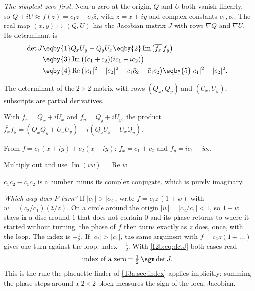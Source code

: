 \emph{The simplest zero first.} Near a zero at the origin, $Q$ and $U$ both vanish linearly, so
$Q+iU\approx f(z)=c_1z+c_2\bar z$, with $z=x+iy$ and complex constants $c_1,c_2$. The real map
$(x,y)\mapsto(Q,U)$ has the Jacobian matrix $J$ with rows $\nabla Q$ and $\nabla U$. Its determinant is
\begin{align}
  \det J
  &\eqby{1}Q_xU_y-Q_yU_x\eqby{2}\operatorname{Im}\big(\overline{f_x}\,f_y\big)\nonumber\\
  &\eqby{3}\operatorname{Im}\big((\bar c_1+\bar c_2)(ic_1-ic_2)\big)\nonumber\\
  &\eqby{4}\operatorname{Re}\big(|c_1|^2-|c_2|^2+c_1\bar c_2-\bar c_1c_2\big)
   \eqby{5}|c_1|^2-|c_2|^2 .
  \label{12b:eq:detJ}
\end{align}
\begin{explain}
  \item The determinant of the $2\times2$ matrix with rows $(Q_x,Q_y)$ and $(U_x,U_y)$; subscripts are partial
        derivatives.
  \item With $f_x=Q_x+iU_x$ and $f_y=Q_y+iU_y$, the product $\overline{f_x}f_y=(Q_xQ_y+U_xU_y)+i(Q_xU_y-U_xQ_y)$.
  \item From $f=c_1(x+iy)+c_2(x-iy)$: $f_x=c_1+c_2$ and $f_y=ic_1-ic_2$.
  \item Multiply out and use $\operatorname{Im}(iw)=\operatorname{Re}w$.
  \item $c_1\bar c_2-\bar c_1c_2$ is a number minus its complex conjugate, which is purely imaginary.
\end{explain}
\emph{Which way does $P$ turn?} If $|c_1|>|c_2|$, write $f=c_1z\,(1+w)$ with $w=(c_2/c_1)(\bar z/z)$. On a circle
around the origin $|w|=|c_2/c_1|<1$, so $1+w$ stays in a disc around $1$ that does not contain $0$ and its phase returns
to where it started without turning; the phase of $f$ then turns exactly as $z$ does, once, with the loop. The index is
$+\frac12$. If $|c_2|>|c_1|$, the same argument with $f=c_2\bar z(1+\dots)$ gives one turn against the loop: index
$-\frac12$. With \eqref{12b:eq:detJ} both cases read
\begin{equation}
  \text{index of a zero}=\tfrac12\,\sgn\det J .
  \label{12b:eq:index-det}
\end{equation}
This is the rule the plaquette finder of \cref{T3a:sec:index} applies implicitly: summing the phase steps around a
$2\times2$ block measures the sign of the local Jacobian.

